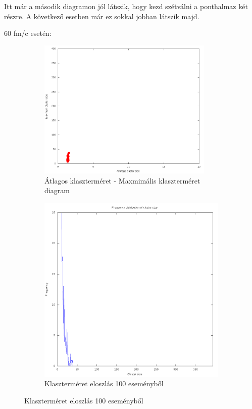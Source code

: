 \documentclass[a4paper,12pt]{article}
\begin{document}
\par Itt már a második diagramon jól látszik, hogy kezd szétválni a ponthalmaz két részre. A következő esetben már ez sokkal jobban 
látszik majd.
\par 60 fm/c esetén:
\begin{figure}[H]
	\centering
	\begin{subfigure}{.49\textwidth}
		\includegraphics[width=0.92\textwidth]{mean-max10_120.png}
		\caption{ Átlagos klaszterméret - Maxmimális klaszterméret diagram }
	\end{subfigure}
	\begin{subfigure}{.49\textwidth}
		\includegraphics[width=.92\textwidth]{distribution_zoomed_10_120.png}
		\caption{ Klaszterméret eloszlás 100 eseményből } 
	\end{subfigure}
\end{figure}
\end{document}
